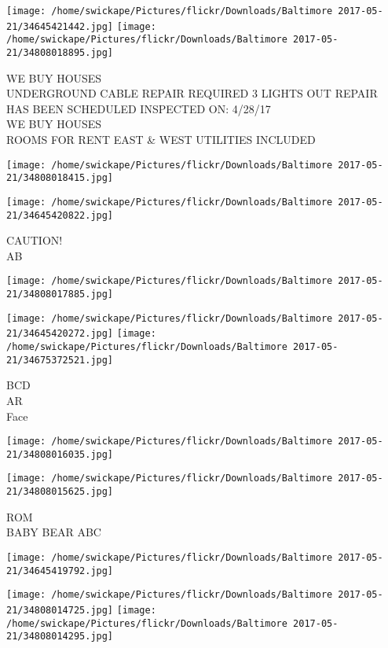 \documentclass[10pt,letterpaper]{article}
\begin{document}
\texttt{[image: /home/swickape/Pictures/flickr/Downloads/Baltimore 2017-05-21/34645421442.jpg]}
\texttt{[image: /home/swickape/Pictures/flickr/Downloads/Baltimore 2017-05-21/34808018895.jpg]}

WE BUY HOUSES\\
UNDERGROUND CABLE REPAIR REQUIRED 3 LIGHTS OUT REPAIR HAS BEEN SCHEDULED INSPECTED ON: 4/28/17\\
WE BUY HOUSES\\
ROOMS FOR RENT EAST \& WEST UTILITIES INCLUDED
\pagebreak

\texttt{[image: /home/swickape/Pictures/flickr/Downloads/Baltimore 2017-05-21/34808018415.jpg]}

\vspace{0.25in}
\texttt{[image: /home/swickape/Pictures/flickr/Downloads/Baltimore 2017-05-21/34645420822.jpg]}

CAUTION!\\
AB
\pagebreak

\texttt{[image: /home/swickape/Pictures/flickr/Downloads/Baltimore 2017-05-21/34808017885.jpg]}

\vspace{0.25in}
\texttt{[image: /home/swickape/Pictures/flickr/Downloads/Baltimore 2017-05-21/34645420272.jpg]}
\texttt{[image: /home/swickape/Pictures/flickr/Downloads/Baltimore 2017-05-21/34675372521.jpg]}

BCD\\
AR\\
Face
\pagebreak

\texttt{[image: /home/swickape/Pictures/flickr/Downloads/Baltimore 2017-05-21/34808016035.jpg]}

\vspace{0.25in}
\texttt{[image: /home/swickape/Pictures/flickr/Downloads/Baltimore 2017-05-21/34808015625.jpg]}

ROM\\
BABY BEAR ABC
\pagebreak

\texttt{[image: /home/swickape/Pictures/flickr/Downloads/Baltimore 2017-05-21/34645419792.jpg]}

\vspace{0.25in}
\texttt{[image: /home/swickape/Pictures/flickr/Downloads/Baltimore 2017-05-21/34808014725.jpg]}
\texttt{[image: /home/swickape/Pictures/flickr/Downloads/Baltimore 2017-05-21/34808014295.jpg]}
\end{document}
